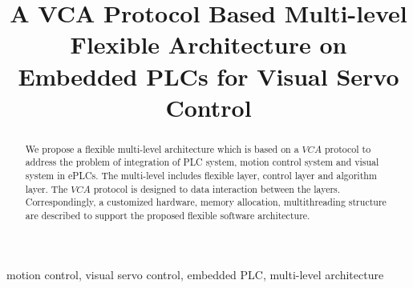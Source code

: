 \documentclass[journal,UTF8]{IEEEtran}
\begin{document}
%
\title{A VCA Protocol Based Multi-level Flexible Architecture on Embedded PLCs for Visual Servo Control }

\maketitle
\begin{abstract}
We propose a flexible multi-level architecture which is based on a $VCA$ protocol to address the problem of integration of PLC system, motion control system and visual system in ePLCs. The multi-level includes flexible layer, control layer and algorithm layer. The $VCA$ protocol is designed to data interaction between the layers. Correspondingly, a customized hardware, memory allocation, multithreading structure are described to support the proposed flexible software architecture.
\end{abstract}

\begin{IEEEkeywords}
motion control, visual servo control, embedded PLC, multi-level architecture
\end{IEEEkeywords}

%
\IEEEpeerreviewmaketitle
\end{document}

